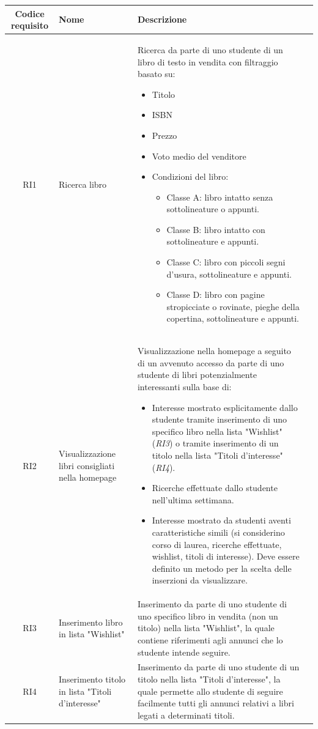 \documentclass[10pt,a4paper]{report}
\begin{document}
	\begin{tabular}{cp{3cm}p{9cm}p{1cm}}
		Codice requisito&Nome&Descrizione\\ \hline
		RI1&Ricerca libro&Ricerca da parte di uno studente di un libro di testo in vendita con filtraggio basato su:
		\begin{itemize}
			\item Titolo
			\item ISBN
			\item Prezzo
			\item Voto medio del venditore
			\item Condizioni del libro:
			\begin{itemize}
				\item Classe A: libro intatto senza sottolineature o appunti.
				\item Classe B: libro intatto con sottolineature e appunti.
				\item Classe C: libro con piccoli segni d'usura, sottolineature e appunti.
				\item Classe D: libro con pagine stropicciate o rovinate, pieghe della copertina, sottolineature e appunti.
			\end{itemize}
			
		\end{itemize}\\ \hline
		RI2&Visualizzazione libri consigliati nella homepage&Visualizzazione nella homepage a seguito di un avvenuto accesso da parte di uno studente di libri potenzialmente interessanti sulla base di:
		\begin{itemize}
			\item Interesse mostrato esplicitamente dallo studente tramite inserimento di uno specifico libro nella lista "Wishlist" (\textit{RI3}) o tramite inserimento di un titolo nella lista "Titoli d'interesse" (\textit{RI4}).
			\item Ricerche effettuate dallo studente nell'ultima settimana.
			\item Interesse mostrato da studenti aventi caratteristiche simili (si considerino corso di laurea, ricerche effettuate, wishlist, titoli di interesse). Deve essere definito un metodo per la scelta delle inserzioni da visualizzare.
		\end{itemize}\\ \hline
		RI3&Inserimento libro in lista "Wishlist"&Inserimento da parte di uno studente di uno specifico libro in vendita (non un titolo) nella lista "Wishlist", la quale contiene riferimenti agli annunci che lo studente intende seguire.\\ \hline
		RI4&Inserimento titolo in lista "Titoli d'interesse"&Inserimento da parte di uno studente di un titolo nella lista "Titoli d'interesse", la quale permette allo studente di seguire facilmente tutti gli annunci relativi a libri legati a determinati titoli.\\ \hline
	\end{tabular}
\end{document}
